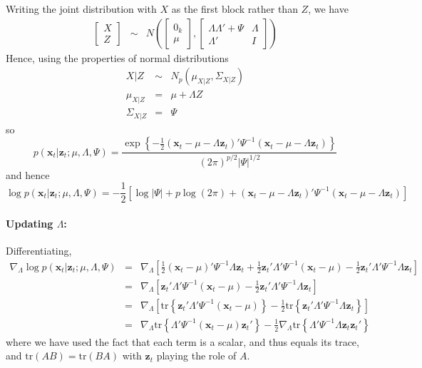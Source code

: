 \documentclass[12pt]{article}
\theoremstyle{definition}
\begin{document}
Writing the joint distribution with $X$ as the first block rather than $Z$, we have
	\begin{eqnarray*}
		\left[\begin{array}{c}
			X\\ Z
		\end{array}\right] 
		&\sim&  N\left(
		\left[\begin{array}{c}
			0_k \\ \mu
	\end{array}\right], 
		\left[\begin{array}{cc}
			 \Lambda \Lambda' + \Psi & \Lambda\\
			 \Lambda' & I
		\end{array} \right] \right)
	\end{eqnarray*}
Hence, using the properties of normal distributions
	\begin{eqnarray*}
		X | Z &\sim& N_p(\mu_{X|Z}, \Sigma_{X|Z})\\
		\mu_{X|Z} &=& \mu + \Lambda Z \\
		\Sigma_{X|Z} &=& \Psi
	\end{eqnarray*}
so 
	$$p(\textbf{x}_t| \textbf{z}_t;\mu, \Lambda, \Psi) = \frac{\exp \left\{-\frac{1}{2}(\mathbf{x}_t - \mu -  \Lambda \textbf{z}_t)' \Psi^{-1} (\mathbf{x}_t - \mu -  \Lambda \textbf{z}_t) \right\}}{{(2\pi)^{p/2}\left|\Psi \right|^{1/2}}}$$
and hence
	$$\log p(\textbf{x}_t| \textbf{z}_t;\mu, \Lambda, \Psi) = -\frac{1}{2}\left[  \log |\Psi| + p \log(2\pi) +(\mathbf{x}_t - \mu -  \Lambda \textbf{z}_t)' \Psi^{-1} (\mathbf{x}_t - \mu -  \Lambda \textbf{z}_t)\right] $$


\paragraph{Updating $\Lambda$:}
Differentiating, 
	\begin{eqnarray*}
		\nabla_\Lambda \log p(\textbf{x}_t| \textbf{z}_t;\mu, \Lambda, \Psi) &=&  \nabla_\Lambda \left[ \frac{1}{2}(\mathbf{x}_t - \mu)' \Psi^{-1} \Lambda \mathbf{z}_t + \frac{1}{2} \mathbf{z}_t' \Lambda'\Psi^{-1} (\mathbf{x}_t - \mu)- \frac{1}{2} \mathbf{z}_t' \Lambda' \Psi^{-1} \Lambda \mathbf{z}_t \right] \\
		&=& \nabla_\Lambda \left[  \mathbf{z}_t' \Lambda'\Psi^{-1} (\mathbf{x}_t - \mu)- \frac{1}{2} \mathbf{z}_t' \Lambda' \Psi^{-1} \Lambda \mathbf{z}_t \right]\\
		&=& \nabla_\Lambda \left[  \mbox{tr}\left\{\mathbf{z}_t' \Lambda'\Psi^{-1} (\mathbf{x}_t - \mu)\right\}- \frac{1}{2} \mbox{tr}\left\{ \mathbf{z}_t' \Lambda' \Psi^{-1} \Lambda \mathbf{z}_t \right\}\right]\\
		&=& \nabla_\Lambda \mbox{tr}\left\{ \Lambda'\Psi^{-1} (\mathbf{x}_t - \mu)\mathbf{z}_t'\right\}- \frac{1}{2} \nabla_\Lambda \mbox{tr}\left\{  \Lambda' \Psi^{-1} \Lambda \mathbf{z}_t \mathbf{z}_t'\right\}
	\end{eqnarray*}
where we have used the fact that each term is a scalar, and thus equals its trace, and $\mbox{tr}(AB) = \mbox{tr}(BA)$ with $\mathbf{z}_t$ playing the role of $A$.
\end{document}
